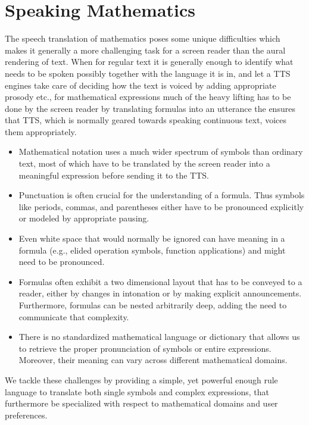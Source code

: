 \documentclass{sig-alternate}
\begin{document}
\section{Speaking Mathematics}
\label{sec:translate}

The speech translation of mathematics poses some unique difficulties which makes
it generally a more challenging task for a screen reader than the aural
rendering of text. When for regular text it is generally enough to identify what
needs to be spoken possibly together with the language it is in, and let a TTS
engines take care of deciding how the text is voiced by adding appropriate
prosody etc., for mathematical expressions much of the heavy lifting has to be
done by the screen reader by translating formulas into an utterance the ensures
that TTS, which is normally geared towards speaking continuous text, voices them
appropriately.

\begin{itemize}
\item Mathematical notation uses a much wider spectrum of symbols than ordinary
  text, most of which have to be translated by the screen reader into a
  meaningful expression before sending it to the TTS.
\item Punctuation is often crucial for the understanding of a formula. Thus
  symbols like periods, commas, and parentheses either have to be pronounced
  explicitly or modeled by appropriate pausing. 
\item Even white space that would normally be ignored can have meaning in a
  formula (e.g., elided operation symbols, function applications) and might need
  to be pronounced.
\item Formulas often exhibit a two dimensional layout that has to be conveyed to
  a reader, either by changes in intonation or by making explicit announcements.
  Furthermore, formulas can be nested arbitrarily deep, adding the need to
  communicate that complexity.
\item There is no standardized mathematical language or dictionary that allows
  us to retrieve the proper pronunciation of symbols or entire
  expressions. Moreover, their meaning can vary across different mathematical
  domains.
\end{itemize}

We tackle these challenges by providing a simple, yet powerful enough rule
language to translate both single symbols and complex expressions, that
furthermore be specialized with respect to mathematical domains and user
preferences.
\end{document}
